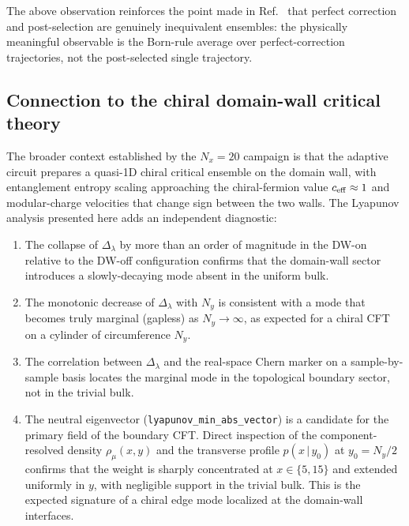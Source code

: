 \documentclass[aps,twocolumn,floatfix,superscriptaddress,nofootinbib]{revtex4-2}
\newcommand{\Dlam}{{\Delta_{\lambda}}}
\begin{document}
The above observation reinforces the point made in
Ref.~\cite{BhuiyanPanJian2026} that perfect correction and post-selection are
genuinely inequivalent ensembles: the physically meaningful observable is the
Born-rule average over perfect-correction trajectories, not the post-selected
single trajectory.

\subsection{Connection to the chiral domain-wall critical theory}
\label{sec:cft}

The broader context established by the $N_x=20$ campaign is that the adaptive
circuit prepares a quasi-1D chiral critical ensemble on the domain wall, with
entanglement entropy scaling approaching the chiral-fermion value
$c_{\rm eff}\approx 1$ and modular-charge velocities that change sign between
the two walls.  The Lyapunov analysis presented here adds an independent
diagnostic:

\begin{enumerate}
\item The collapse of $\Dlam$ by more than an order of magnitude in the DW-on
  relative to the DW-off configuration confirms that the domain-wall sector
  introduces a slowly-decaying mode absent in the uniform bulk.

\item The monotonic decrease of $\Dlam$ with $N_y$ is consistent with a mode
  that becomes truly marginal (gapless) as $N_y\to\infty$, as expected for a
  chiral CFT on a cylinder of circumference $N_y$.

\item The correlation between $\Dlam$ and the real-space Chern marker on a
  sample-by-sample basis locates the marginal mode in the topological boundary
  sector, not in the trivial bulk.

\item The neutral eigenvector (\texttt{lyapunov\_min\_abs\_vector}) is a
  candidate for the primary field of the boundary CFT.  Direct inspection of
  the component-resolved density $\rho_\mu(x,y)$ and the transverse profile
  $p(x\,|\,y_0)$ at $y_0=N_y/2$ confirms that the weight is sharply
  concentrated at $x\in\{5,15\}$ and extended uniformly in $y$, with
  negligible support in the trivial bulk.  This is the expected signature of a
  chiral edge mode localized at the domain-wall interfaces.
\end{enumerate}
\end{document}
